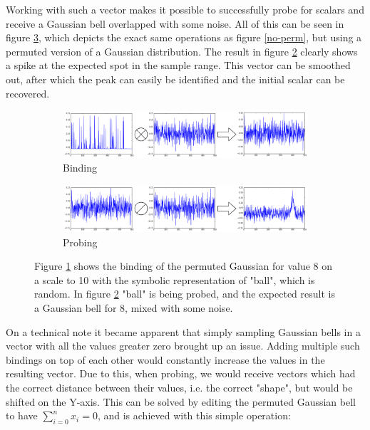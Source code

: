 \documentclass[conference]{IEEEtran}
\begin{document}
	Working with such a vector makes it possible to successfully probe for scalars and receive a Gaussian bell overlapped with some noise.
All of this can be seen in figure \ref{perm}, which depicts the exact same operations as figure \ref{no-perm}, but using a permuted version of a Gaussian distribution.
The result in figure \ref{perm-b} clearly shows a spike at the expected spot in the sample range.
This vector can be smoothed out, after which the peak can easily be identified and the initial scalar can be recovered.
	
	\begin{figure}
		\begin{subfigure}{1\columnwidth}
			\includegraphics[width=\columnwidth]{img/scalar-post-perm.png}
			\caption{Binding}
			\label{perm-a}
		\end{subfigure}
		\begin{subfigure}{1\columnwidth}
			\includegraphics[width=\columnwidth]{img/scalar-post-perm-probe.png}
			\caption{Probing}
			\label{perm-b}
		\end{subfigure}
		\caption{Figure \ref{perm-a} shows the binding of the permuted Gaussian for value 8 on a scale to 10 with the symbolic representation of "ball", which is random.
In figure \ref{perm-b} "ball" is being probed, and the expected result is a Gaussian bell for 8, mixed with some noise.}
		\label{perm}
	\end{figure}
	
	On a technical note it became apparent that simply sampling Gaussian bells in a vector with all the values greater zero brought up an issue.
Adding multiple such bindings on top of each other would constantly increase the values in the resulting vector.
Due to this, when probing, we would receive vectors which had the correct distance between their values, i.e.
the correct "shape", but would be shifted on the Y-axis.
This can be solved by editing the permuted Gaussian bell to have \(\sum_{i=0}^n x_i = 0\), and is achieved with this simple operation:
	
\end{document}
